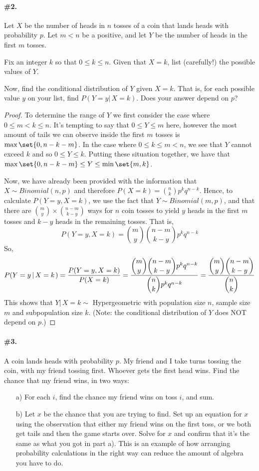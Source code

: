 \documentclass[12pt,titlepage]{article}
\newcommand{\given}[1]{ \left| \, {#1} \right.}
\begin{document}
\paragraph{\#2.}
Let $X$ be the number of heads in $n$ tosses of a coin that lands heads with probability $p$. Let $m < n$ be a positive, and let $Y$ be the number of heads in the first $m$ tosses. 

Fix an integer $k$ so that $0 \leq k \leq n$. Given that $X=k$, list (carefully!) the possible values of $Y$. 

Now, find the conditional distribution of $Y$ given $X=k$. That is, for each possible value $y$ on your list, find $P(Y=y\given{X=k})$. Does your answer depend on $p$?
\begin{proof} 
To determine the range of $Y$ we first consider the case where $0 \leq m < k \leq n$. It's tempting to say that $0 \leq Y \leq m$ here, however the most amount of tails we can observe inside the first $m$ tosses is $\max\set{0,n-k-m}$. In the case where $0 \leq k \leq m < n$, we see that $Y$ cannot exceed $k$ and so $0 \leq Y \leq k$. Putting these situation together, we have that $\max\set{0,n-k-m} \leq Y \leq \min\set{m,k}$. 

Now, we have already been provided with the information that  $X \sim Binomial(n,p)$ and therefore $P(X=k)=\binom{n}{k}p^{k}q^{n-k}$. Hence, to calculate $P(Y=y, X=k)$, we use the fact that $Y \sim Binomial(m,p)$, and that there are $\binom{m}{y}\times\binom{n-m}{k-y}$ ways for $n$ coin tosses to yield $y$ heads in the first $m$ tosses and $k-y$ heads in the remaining tosses. That is,
\[
P(Y=y,X=k) = \binom{m}{y}\binom{n-m}{k-y} p^{k}q^{n-k}
\]
So,
\[
P(Y=y \given{X=k}) = \frac{P(Y=y,X=k)}{P(X=k)} = \frac{\dbinom{m}{y} \dbinom{n-m}{k-y} p^{k} q^{n-k}}{\dbinom{n}{k}p^{k}q^{n-k}} = \frac{\dbinom{m}{y} \dbinom{n-m}{k-y}}{\dbinom{n}{k}}
\]
This shows that $Y\given{X=k} \sim$ Hypergeometric with population size $n$, sample size $m$ and subpopulation size $k$. (Note: the conditional distribution of $Y$ does NOT depend on $p$.)
\end{proof}

\paragraph{\#3.}A coin lands heads with probability $p$. My friend and I take turns tossing the coin, with my friend tossing first. Whoever gets the first head wins. Find the chance that my friend wins, in two ways:
\begin{enumerate}
\item[a)] For each $i$, find the chance my friend wins on toss $i$, and sum.
\item[b)] Let $x$ be the chance that you are trying to find. Set up an equation for $x$ using the observation that either my friend wins on the first toss, or we both get tails and then the game starts over. Solve for $x$ and confirm that it's the same as what you got in part a). This is an example of how arranging probability calculations in the right way can reduce the amount of algebra you have to do.
\end{enumerate}
\end{document}
